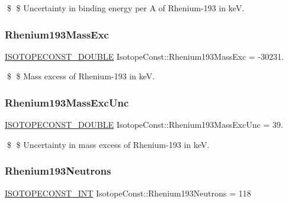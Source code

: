 \$ \$ Uncertainty in binding energy per A of Rhenium-\/193 in keV. \mbox{\label{group___isotope_const-_rhenium-_re193_gabbdcdcf72d34de8b7b54a9b12efb6f59}} 
\subsubsection{\texorpdfstring{Rhenium193\+Mass\+Exc}{Rhenium193MassExc}}
{\footnotesize\ttfamily \mbox{\hyperlink{group___isotope_const-_macros_ga8f45a7272ce02c0b4c65c44636ed719a}{I\+S\+O\+T\+O\+P\+E\+C\+O\+N\+S\+T\+\_\+\+D\+O\+U\+B\+LE}} Isotope\+Const\+::\+Rhenium193\+Mass\+Exc = -\/30231.}

\$ \$ Mass excess of Rhenium-\/193 in keV. \mbox{\label{group___isotope_const-_rhenium-_re193_ga7921ca6b92b82dccca679b951b8451cd}} 
\subsubsection{\texorpdfstring{Rhenium193\+Mass\+Exc\+Unc}{Rhenium193MassExcUnc}}
{\footnotesize\ttfamily \mbox{\hyperlink{group___isotope_const-_macros_ga8f45a7272ce02c0b4c65c44636ed719a}{I\+S\+O\+T\+O\+P\+E\+C\+O\+N\+S\+T\+\_\+\+D\+O\+U\+B\+LE}} Isotope\+Const\+::\+Rhenium193\+Mass\+Exc\+Unc = 39.}

\$ \$ Uncertainty in mass excess of Rhenium-\/193 in keV. \mbox{\label{group___isotope_const-_rhenium-_re193_gacf39959bab8262870a2e68313b57468f}} 
\subsubsection{\texorpdfstring{Rhenium193\+Neutrons}{Rhenium193Neutrons}}
{\footnotesize\ttfamily \mbox{\hyperlink{group___isotope_const-_macros_ga5f18360b3e99483a35c32d789e62621c}{I\+S\+O\+T\+O\+P\+E\+C\+O\+N\+S\+T\+\_\+\+I\+NT}} Isotope\+Const\+::\+Rhenium193\+Neutrons = 118}

